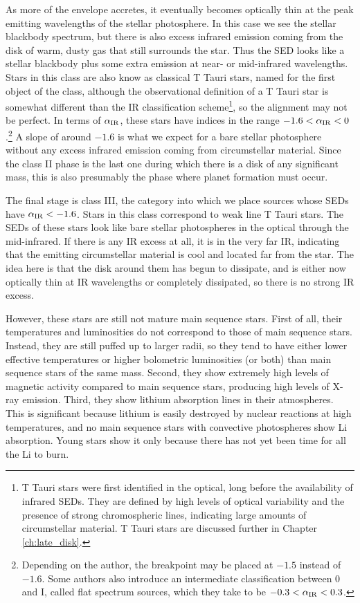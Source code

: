 As more of the envelope accretes, it eventually becomes optically thin at the peak emitting wavelengths of the stellar photosphere. In this case we see the stellar blackbody spectrum, but there is also excess infrared emission coming from the disk of warm, dusty gas that still surrounds the star. Thus the SED looks like a stellar blackbody plus some extra emission at near- or mid-infrared wavelengths. Stars in this class are also know as classical T Tauri stars, named for the first object of the class, although the observational definition of a T Tauri star is somewhat different than the IR classification scheme\footnote{T Tauri stars were first identified in the optical, long before the availability of infrared SEDs. They are defined by high levels of optical variability and the presence of strong chromospheric lines, indicating large amounts of circumstellar material. T Tauri stars are discussed further in Chapter \ref{ch:late_disk}.}, so the alignment may not be perfect. In terms of $\alpha_{\rm IR}$, these stars have indices in the range $-1.6 < \alpha_{\rm IR} < 0$.\footnote{Depending on the author, the breakpoint may  be placed at $-1.5$ instead of $-1.6$. Some authors also introduce an intermediate classification between 0 and I, called flat spectrum sources, which they take to be $-0.3 < \alpha_{\rm IR} < 0.3$.} A slope of around $-1.6$ is what we expect for a bare stellar photosphere without any excess infrared emission coming from circumstellar material. Since the class II phase is the last one during which there is a disk of any significant mass, this is also presumably the phase where planet formation must occur.

The final stage is class III, the category into which we place sources whose SEDs have $\alpha_{\rm IR} < -1.6$. Stars in this class correspond to weak line T Tauri stars. The SEDs of these stars look like bare stellar photospheres in the optical through the mid-infrared. If there is any IR excess at all, it is in the very far IR, indicating that the emitting circumstellar material is cool and located far from the star. The idea here is that the disk around them has begun to dissipate, and is either now optically thin at IR wavelengths or completely dissipated, so there is no strong IR excess. 

However, these stars are still not mature main sequence stars. First of all, their temperatures and luminosities do not correspond to those of main sequence stars. Instead, they are still puffed up to larger radii, so they tend to have either lower effective temperatures or higher bolometric luminosities (or both) than main sequence stars of the same mass. Second, they show extremely high levels of magnetic activity compared to main sequence stars, producing high levels of X-ray emission. Third, they show lithium absorption lines in their atmospheres. This is significant because lithium is easily destroyed by nuclear reactions at high temperatures, and no main sequence stars with convective photospheres show Li absorption. Young stars show it only because there has not yet been time for all the Li to burn.

